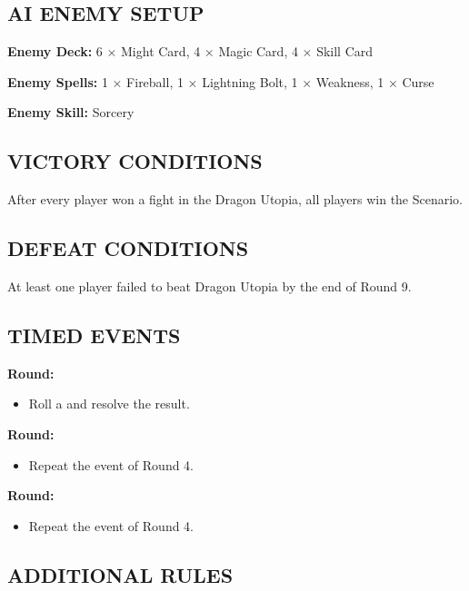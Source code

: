 \begin{multicols}{2}
\subsection*{\MakeUppercase{AI Enemy Setup}}

\textbf{Enemy Deck:} 6 × Might Card, 4 × Magic Card, 4 × Skill Card

\textbf{Enemy Spells:} 1 × Fireball, 1 × Lightning Bolt, 1 × Weakness, 1 × Curse

\textbf{Enemy Skill:} Sorcery

\subsection*{\MakeUppercase{Victory Conditions}}

After every player won a fight in the Dragon Utopia, all players win the Scenario.

\subsection*{\MakeUppercase{Defeat Conditions}}

At least one player failed to beat Dragon Utopia by the end of Round 9.

\subsection*{\MakeUppercase{Timed Events}}
\textbf{ Round:}
\begin{itemize}
  \item Roll a  and resolve the result.
\end{itemize}
\textbf{ Round:}
\begin{itemize}
  \item Repeat the event of Round 4.
\end{itemize}
\textbf{ Round:}
\begin{itemize}
  \item Repeat the event of Round 4.
\end{itemize}

\subsection*{\MakeUppercase{Additional Rules}}


\end{multicols}
